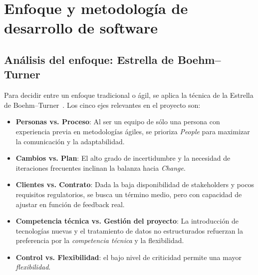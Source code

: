 

\section{Enfoque y metodología de desarrollo de software}

\subsection{Análisis del enfoque: Estrella de Boehm–Turner}
Para decidir entre un enfoque tradicional o ágil, se aplica la técnica de la Estrella de Boehm–Turner~\cite{boehm_turner2003}. Los cinco ejes relevantes en el proyecto son:

\begin{itemize}
	\item \textbf{Personas vs. Proceso}: Al ser un equipo de sólo una persona con experiencia previa en metodologías ágiles, se prioriza \emph{People} para maximizar la comunicación y la adaptabilidad.
	\item \textbf{Cambios vs. Plan}: El alto grado de incertidumbre y la necesidad de iteraciones frecuentes inclinan la balanza hacia \emph{Change}.
	\item \textbf{Clientes vs. Contrato}: Dada la baja disponibilidad de stakeholders y pocos requisitos regulatorios, se busca un término medio, pero con capacidad de ajustar en función de feedback real.
	\item \textbf{Competencia técnica vs. Gestión del proyecto}: La introducción de tecnologías nuevas y el tratamiento de datos no estructurados refuerzan la preferencia por la \emph{competencia técnica} y la flexibilidad.
	\item \textbf{Control vs. Flexibilidad}: el bajo nivel de criticidad permite una mayor \emph{flexibilidad}.
\end{itemize}

